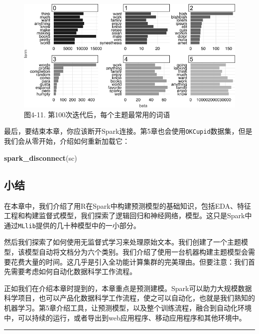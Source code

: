 \documentclass[
]{article}
\newenvironment{Shaded}{\begin{snugshade}}{\end{snugshade}}
\newcommand{\KeywordTok}[1]{\textcolor[rgb]{0.13,0.29,0.53}{\textbf{#1}}}
\newcommand{\NormalTok}[1]{#1}
\begin{document}
\begin{figure}
\centering
\includegraphics{figures/4_11.png}
\caption{图4-11. 第100次迭代后，每个主题最常用的词语}
\end{figure}

最后，要结束本章，你应该断开Spark连接。第5章也会使用\texttt{OKCupid}数据集，但是我们会从零开始，介绍如何重新加载它：

\begin{Shaded}
\begin{Highlighting}[]
\KeywordTok{spark_disconnect}\NormalTok{(sc)}
\end{Highlighting}
\end{Shaded}

\hypertarget{ux5c0fux7ed3-3}{%
\subsection{小结}\label{ux5c0fux7ed3-3}}

在本章中，我们介绍了用R在Spark中构建预测模型的基础知识，包括EDA、特征工程和构建监督式模型，我们探索了逻辑回归和神经网络，模型。这只是Spark中通过\texttt{MLlib}提供的几十种模型中的一小部分。

然后我们探索了如何使用无监督式学习来处理原始文本。我们创建了一个主题模型，该模型自动将文档分为六个类别。我们介绍了使用一台机器构建主题模型会需要花费大量的时间。这几乎是引入全功能计算集群的完美理由。但要注意：我们首先需要考虑如何自动化数据科学工作流程。

正如我们在介绍本章时提到的，本章重点是预测建模。Spark可以助力大规模数据科学项目，也可以产品化数据科学工作流程，使之可以自动化，也就是我们熟知的机器学习。第5章介绍工具，让预测模型，以及整个训练流程，融合到自动化环境中，可以持续的运行，或者导出到web应用程序、移动应用程序和其他环境中。

\begin{center}\rule{0.5\linewidth}{\linethickness}\end{center}
\end{document}
